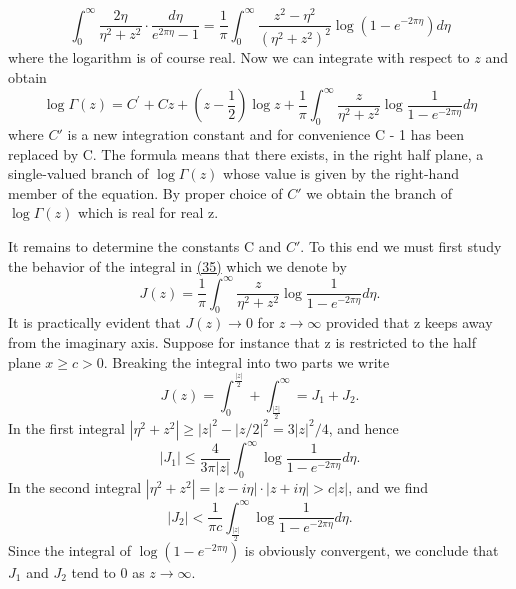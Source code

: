 \begin{equation*}
\int_ {0} ^ {\infty} \frac {2 \eta}{\eta^ {2} + z ^ {2}} \cdot \frac {d \eta}{e ^ {2 \pi \eta} - 1} = \frac {1}{\pi} \int_ {0} ^ {\infty} \frac {z ^ {2} - \eta^ {2}}{(\eta^ {2} + z ^ {2}) ^ {2}} \log (1 - e ^ {- 2 \pi \eta}) d \eta
\end{equation*}
where the logarithm is of course real. Now we can integrate with respect to $z$ and obtain
\begin{equation*}
\log \Gamma (z) = C ^ {\prime} + C z + \left(z - \frac {1}{2}\right) \log z + \frac {1}{\pi} \int_ {0} ^ {\infty} \frac {z}{\eta^ {2} + z ^ {2}} \log \frac {1}{1 - e ^ {- 2 \pi \eta}} d \eta \tag{35}\label{eq:5.35}
\end{equation*}
where $C'$ is a new integration constant and for convenience C - 1 has been replaced by C. The formula means that there exists, in the right half plane, a single-valued branch of $\log \Gamma(z)$ whose value is given by the right-hand member of the equation. By proper choice of $C'$ we obtain the branch of $\log \Gamma(z)$ which is real for real z.

It remains to determine the constants C and $C'$. To this end we must first study the behavior of the integral in \hyperref[eq:5.35]{(35)} which we denote by
\begin{equation*}
J (z) = \frac {1}{\pi} \int_ {0} ^ {\infty} \frac {z}{\eta^ {2} + z ^ {2}} \log \frac {1}{1 - e ^ {- 2 \pi \eta}} d \eta .\tag{36}\label{eq:5.36}
\end{equation*}
It is practically evident that $J(z) \to 0$ for $z \to \infty$ provided that z keeps away from the imaginary axis. Suppose for instance that z is restricted to the half plane $x \geq c > 0$. Breaking the integral into two parts we write
\begin{equation*}
J (z) = \int_ {0} ^ {\frac {| z |}{2}} + \int_ {\frac {| z |}{2}} ^ {\infty} = J _ {1} + J _ {2}.
\end{equation*}
In the first integral $|\eta^2 + z^2| \geq |z|^2 - |z/2|^2 = 3|z|^2/4$, and hence
\begin{equation*}
\left| J _ {1} \right| \leq \frac {4}{3 \pi | z |} \int_ {0} ^ {\infty} \log \frac {1}{1 - e ^ {- 2 \pi \eta}} d \eta .
\end{equation*}
In the second integral $|\eta^2 + z^2| = |z - i\eta| \cdot |z + i\eta| > c|z|$, and we find
\begin{equation*}
\left| J _ {2} \right| <   \frac {1}{\pi c} \int_ {\frac {| z |}{2}} ^ {\infty} \log \frac {1}{1 - e ^ {- 2 \pi \eta}} d \eta .
\end{equation*}
Since the integral of $\log\left(1-e^{-2\pi\eta}\right)$ is obviously convergent, we conclude that $J_{1}$ and $J_{2}$ tend to 0 as $z\to\infty$.

